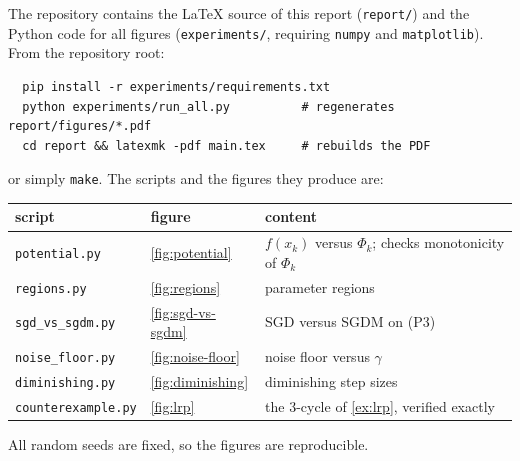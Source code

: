 The repository contains the \LaTeX{} source of this report (\texttt{report/}) and the
Python code for all figures (\texttt{experiments/}, requiring \texttt{numpy} and
\texttt{matplotlib}). From the repository root:
\begin{verbatim}
  pip install -r experiments/requirements.txt
  python experiments/run_all.py          # regenerates report/figures/*.pdf
  cd report && latexmk -pdf main.tex     # rebuilds the PDF
\end{verbatim}
or simply \texttt{make}. The scripts and the figures they produce are:
\begin{center}\small
\begin{tabular}{@{}lll@{}}
\toprule
script & figure & content\\
\midrule
\texttt{potential.py} & \cref{fig:potential} & $f(x_k)$ versus $\Phi_k$; checks monotonicity of $\Phi_k$\\
\texttt{regions.py} & \cref{fig:regions} & parameter regions\\
\texttt{sgd\_vs\_sgdm.py} & \cref{fig:sgd-vs-sgdm} & SGD versus SGDM on (P3)\\
\texttt{noise\_floor.py} & \cref{fig:noise-floor} & noise floor versus $\gamma$\\
\texttt{diminishing.py} & \cref{fig:diminishing} & diminishing step sizes\\
\texttt{counterexample.py} & \cref{fig:lrp} & the $3$-cycle of \cref{ex:lrp}, verified exactly\\
\bottomrule
\end{tabular}
\end{center}
All random seeds are fixed, so the figures are reproducible.

